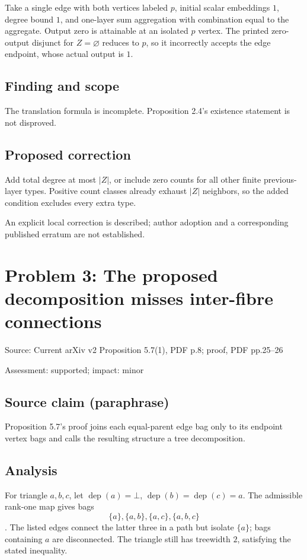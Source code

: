 \documentclass[11pt]{article}
\begin{document}
Take a single edge with both vertices labeled \(p\), initial scalar embeddings \(1\), degree bound \(1\), and one-layer sum aggregation with combination equal to the aggregate. Output zero is attainable at an isolated \(p\) vertex. The printed zero-output disjunct for \(Z=\varnothing\) reduces to \(p\), so it incorrectly accepts the edge endpoint, whose actual output is \(1\).

\subsection*{Finding and scope}

The translation formula is incomplete. Proposition 2.4’s existence statement is not disproved.

\subsection*{Proposed correction}

Add total degree at most \(|Z|\), or include zero counts for all other finite previous-layer types. Positive count classes already exhaust \(|Z|\) neighbors, so the added condition excludes every extra type.

An explicit local correction is described; author adoption and a corresponding published erratum are not established.

\section*{Problem 3: The proposed decomposition misses inter-fibre connections}

Source: Current arXiv v2 Proposition 5.7(1), PDF p.8; proof, PDF pp.25–26

Assessment: supported; impact: minor

\subsection*{Source claim (paraphrase)}

Proposition 5.7’s proof joins each equal-parent edge bag only to its endpoint vertex bags and calls the resulting structure a tree decomposition.

\subsection*{Analysis}

For triangle \(a,b,c\), let \(\operatorname{dep}(a)=\bot\), \(\operatorname{dep}(b)=\operatorname{dep}(c)=a\). The admissible rank-one map gives bags \[\{a\},\{a,b\},\{a,c\},\{a,b,c\}\]. The listed edges connect the latter three in a path but isolate \(\{a\}\); bags containing \(a\) are disconnected. The triangle still has treewidth \(2\), satisfying the stated inequality.
\end{document}
